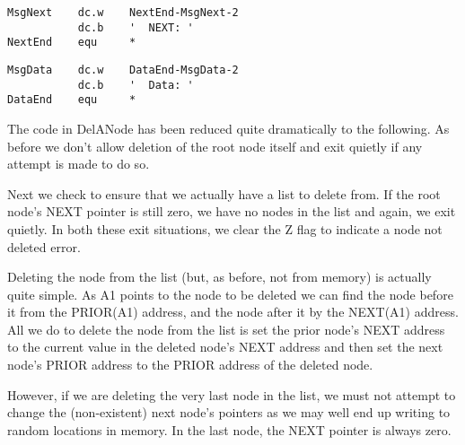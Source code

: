 \begin{lstlisting}[firstnumber=156,caption={Changes to MsgNext Text Data}]
MsgNext    dc.w    NextEnd-MsgNext-2
           dc.b    '  NEXT: '
NextEnd    equ     *
\end{lstlisting}


\begin{lstlisting}[firstnumber=167,caption={Changes to MsgData Text Data}]
MsgData    dc.w    DataEnd-MsgData-2
           dc.b    '  Data: '
DataEnd    equ     *
\end{lstlisting}

The code in DelANode has been reduced quite dramatically to the following. As before we
don't allow deletion of the root node itself and exit quietly if any attempt is made to
do so.

Next we check to ensure that we actually have a list to delete from. If the root
node's NEXT pointer is still zero, we have no nodes in the list and again, we exit
quietly. In both these exit situations, we clear the Z flag to indicate a node not
deleted error.

Deleting the node from the list (but, as before, not from memory) is actually quite
simple. As A1 points to the node to be deleted we can find the node before it from the
PRIOR(A1) address, and the node after it by the NEXT(A1) address. All we do to delete the
node from the list is set the prior node's NEXT address to the current value in the
deleted node's NEXT address and then set the next node's PRIOR address to the PRIOR
address of the deleted node.

However, if we are deleting the very last node in the list, we must not attempt to
change the (non-{}existent) next node's pointers as we may well end up writing to random
locations in memory. In the last node, the NEXT pointer is always zero.

